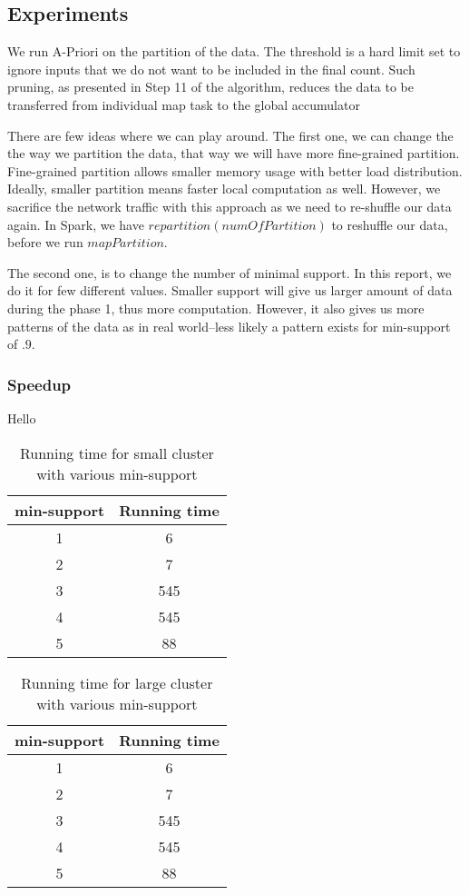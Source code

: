 \documentclass[11pt]{article}
\begin{document}
\subsection{Experiments}

We run A-Priori on the partition of the data.
The threshold is a hard limit set to ignore inputs that we do not want to be included in the final count.
Such pruning, as presented in Step 11 of the algorithm, reduces the data to be transferred from individual map task to the global accumulator

There are few ideas where we can play around.
The first one, we can change the the way we partition the data, that way we will have more fine-grained partition.
Fine-grained partition allows smaller memory usage with better load distribution.
Ideally, smaller partition means faster local computation as well.
However, we sacrifice the network traffic with this approach as we need to re-shuffle our data again.
In Spark, we have $repartition(numOfPartition)$ to reshuffle our data, before we run $mapPartition$.

The second one, is to change the number of minimal support.
In this report, we do it for few different values.
Smaller support will give us larger amount of data during the phase 1, thus more computation.
However, it also gives us more patterns of the data as in real world--less likely a pattern exists for min-support of $.9$.

\subsubsection{Speedup}

Hello

\begin{table}
    \centering
    \begin{tabular}{||c c||}
        \hline
        min-support & Running time \\
        \hline\hline
        1 & 6 \\
        2 & 7 \\
        3 & 545 \\
        4 & 545 \\
        5 & 88 \\ [1ex]
        \hline
    \end{tabular}
    \caption{Running time for small cluster with various min-support}
    \label{table:1}
\end{table}

\begin{table}
    \centering
    \begin{tabular}{||c c||}
        \hline
        min-support & Running time \\
        \hline\hline
        1 & 6 \\
        2 & 7 \\
        3 & 545 \\
        4 & 545 \\
        5 & 88 \\
        \hline
    \end{tabular}
    \caption{Running time for large cluster with various min-support}
    \label{table:2}
\end{table}
\end{document}
